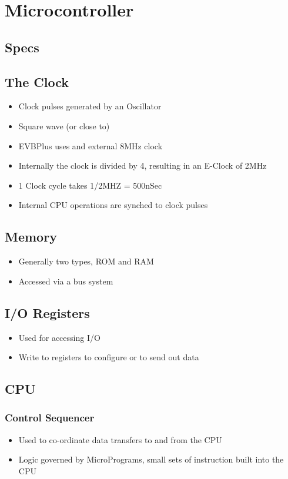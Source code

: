 \section{Microcontroller}
	\subsection{Specs}
	
	\subsection{The Clock}
		\begin{itemize}
			\item Clock pulses generated by an Oscillator
			\item Square wave (or close to)
			\item EVBPlus uses and external 8MHz clock
			\item Internally the clock is divided by 4, resulting in an E-Clock of 2MHz
			\item 1 Clock cycle takes 1/2MHZ = 500nSec
			\item Internal CPU operations are synched to clock pulses
		\end{itemize}
		
	\subsection{Memory}
		\begin{itemize}
			\item Generally two types, ROM and RAM
			\item Accessed via a bus system
		\end{itemize}

	\subsection{I/O Registers}
		\begin{itemize}
			\item Used for accessing I/O
			\item Write to registers to configure or to send out data
		\end{itemize}
	
	\subsection{CPU}
		\subsubsection{Control Sequencer}
			\begin{itemize}
				\item Used to co-ordinate data transfers to and from the CPU
				\item Logic governed by MicroPrograms, small sets of instruction built into the CPU
			\end{itemize}
		
